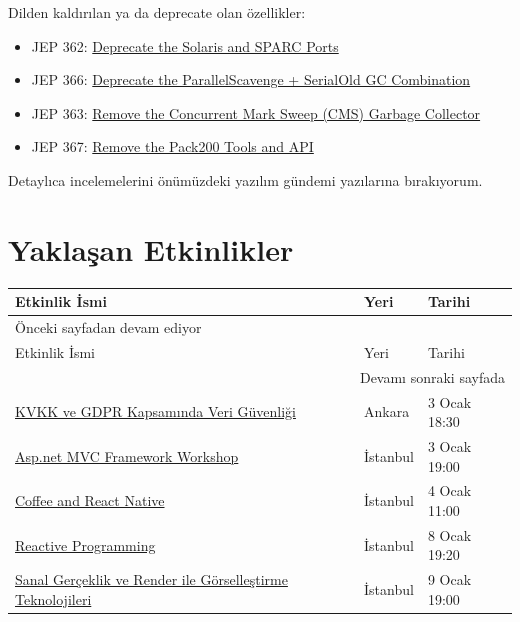\documentclass[11pt]{article}
\begin{document}
Dilden kaldırılan ya da deprecate olan özellikler:
\begin{itemize}
\item JEP 362: \href{https://openjdk.java.net/jeps/362}{Deprecate the Solaris and SPARC Ports}
\item JEP 366: \href{https://openjdk.java.net/jeps/366}{Deprecate the ParallelScavenge + SerialOld GC Combination}
\item JEP 363: \href{https://openjdk.java.net/jeps/363}{Remove the Concurrent Mark Sweep (CMS) Garbage Collector}
\item JEP 367: \href{https://openjdk.java.net/jeps/367}{Remove the Pack200 Tools and API}
\end{itemize}

Detaylıca incelemelerini önümüzdeki yazılım gündemi yazılarına bırakıyorum.
\section{Yaklaşan Etkinlikler}
\label{sec:org9ef6bad}
\begin{longtable}{|p{8cm}|l|l|}
\hline
Etkinlik İsmi & Yeri & Tarihi\\
\hline
\endfirsthead
\multicolumn{3}{l}{Önceki sayfadan devam ediyor} \\
\hline

Etkinlik İsmi & Yeri & Tarihi \\

\hline
\endhead
\hline\multicolumn{3}{r}{Devamı sonraki sayfada} \\
\endfoot
\endlastfoot
\hline
\href{https://www.meetup.com/Hukuk-ve-Teknoliji-Meetup-Grubu/events/267223619/}{KVKK ve GDPR Kapsamında Veri Güvenliği} & Ankara & 3 Ocak 18:30\\
\href{https://www.meetup.com/Yaz\%25C4\%25B1l\%25C4\%25B1m-Geli\%25C5\%259Ftiricileri-Geli\%25C5\%259Ftirme/events/266380738/}{Asp.net MVC Framework Workshop} & İstanbul & 3 Ocak 19:00\\
\href{https://www.meetup.com/Coffee-And-React-Native-\%25C4\%25B0stanbul/events/vzxzkrybccbgb/}{Coffee and React Native} & İstanbul & 4 Ocak 11:00\\
\href{https://www.meetup.com/CodeHAP-Habbit-Art-Passion/events/267414497/}{Reactive Programming} & İstanbul & 8 Ocak 19:20\\
\href{https://www.meetup.com/Gorsellestirme-Teknolojileri/events/266312464/}{Sanal Gerçeklik ve Render ile Görselleştirme Teknolojileri} & İstanbul & 9 Ocak 19:00\\
\hline
\end{longtable}
\end{document}
